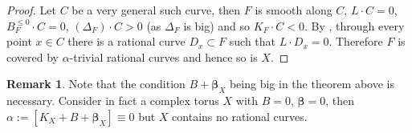 \documentclass[11pt]{amsart}
\numberwithin{equation}{section}
\def\bbeta{\boldsymbol{\beta}}
\def\dim{\operatorname{dim}}
\theoremstyle{definition}
\theoremstyle{definition}
\theoremstyle{definition}
\newtheorem{remark}[theorem]{Remark}
\begin{document}
\begin{proof}
Let $C$ be a very general such curve, then $F$ is smooth along $C$, $L\cdot C=0$, $ B_F^{\leq 0}\cdot C=0$, $(\Delta _F)\cdot C >0$ (as $\Delta _F$ is big) and so $K_F\cdot C<0$. By \cite[Theorem 5.8]{Kol96}, through every point $x\in C$ there is a rational curve $D_x\subset F$ such that $L\cdot D_x=0$. Therefore $F$ is covered by $\alpha$-trivial rational curves and hence so is $X$.
\end{proof}

\begin{remark}
Note that the condition $B+\bbeta_X$ being big in the theorem above is necessary.
Consider in fact a complex torus $X$ with $B = 0$, $\bbeta = 0$, then
$\alpha:= [K_X+B+\bbeta_X]\equiv 0$ %
but $X$ contains no rational curves.%
\end{remark}
\end{document}
